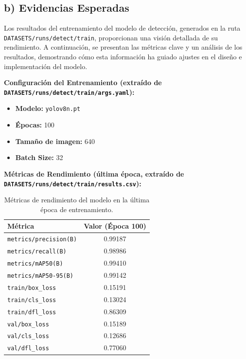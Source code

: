 \documentclass[10pt,a4paper]{report}
\begin{document}
\subsection{b) Evidencias Esperadas}

Los resultados del entrenamiento del modelo de detección, generados en la ruta \texttt{DATASETS/runs/detect/train}, proporcionan una visión detallada de su rendimiento. A continuación, se presentan las métricas clave y un análisis de los resultados, demostrando cómo esta información ha guiado ajustes en el diseño e implementación del modelo.

\textbf{Configuración del Entrenamiento (extraído de \texttt{DATASETS/runs/detect/train/args.yaml}):}
\begin{itemize}
    \item \textbf{Modelo:} \texttt{yolov8n.pt}
    \item \textbf{Épocas:} 100
    \item \textbf{Tamaño de imagen:} 640
    \item \textbf{Batch Size:} 32
\end{itemize}

\textbf{Métricas de Rendimiento (última época, extraído de \texttt{DATASETS/runs/detect/train/results.csv}):}

\begin{table}[h!]
    \centering
    \begin{tabular}{lc}
        \toprule
        \textbf{Métrica} & \textbf{Valor (Época 100)} \\
        \midrule
        \texttt{metrics/precision(B)} & 0.99187 \\
        \texttt{metrics/recall(B)} & 0.98986 \\
        \texttt{metrics/mAP50(B)} & 0.99410 \\
        \texttt{metrics/mAP50-95(B)} & 0.99142 \\
        \texttt{train/box\_loss} & 0.15191 \\
        \texttt{train/cls\_loss} & 0.13024 \\
        \texttt{train/dfl\_loss} & 0.86309 \\
        \texttt{val/box\_loss} & 0.15189 \\
        \texttt{val/cls\_loss} & 0.12686 \\
        \texttt{val/dfl\_loss} & 0.77060 \\
        \bottomrule
    \end{tabular}
    \caption{Métricas de rendimiento del modelo en la última época de entrenamiento.}
    \label{tab:metrics}
\end{table}
\end{document}
